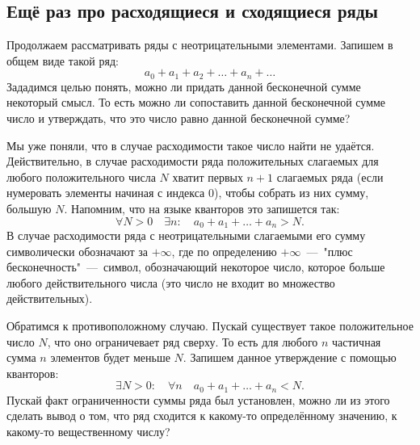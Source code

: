 \documentclass[12pt]{article}
\begin{document}
\subsection{Ещё раз про расходящиеся и сходящиеся ряды}
Продолжаем рассматривать ряды с неотрицательными элементами. Запишем в общем виде такой ряд:
\begin{equation}\label{eq:15}
    a_0 + a_1 + a_2 + \ldots + a_n + \ldots
\end{equation}
Зададимся целью понять, можно ли придать данной бесконечной сумме некоторый смысл. То есть можно ли сопоставить данной бесконечной сумме число и утверждать, что это число равно данной бесконечной сумме?
\par
Мы уже поняли, что в случае расходимости такое число найти не удаётся. Действительно, в случае расходимости ряда положительных слагаемых для любого положительного числа $N$ хватит первых $n + 1$ слагаемых ряда (если нумеровать элементы начиная с индекса $0$), чтобы собрать из них сумму, большую $N$. Напомним, что на языке кванторов это запишется так:
\begin{equation}
    \forall N > 0 \quad \exists n: \quad a_0 + a_1 + \ldots + a_n > N.
\end{equation}
В случае расходимости ряда с неотрицательными слагаемыми его сумму символически обозначают за $+\infty$, где по определению $+\infty$~\----~"плюс бесконечность"{}~\----~символ, обозначающий некоторое число, которое больше любого действительного числа (это число не входит во множество действительных).
\par
Обратимся к противоположному случаю. Пускай существует такое положительное число $N$, что оно ограничевает ряд сверху. То есть для любого $n$ частичная сумма $n$ элементов будет меньше $N$. Запишем данное утверждение с помощью кванторов:
\begin{equation}\label{eq:17}
    \exists N>0: \quad \forall n \quad a_0+a_1+\ldots+a_n<N.
\end{equation}
Пускай факт ограниченности суммы ряда был установлен, можно ли из этого сделать вывод о том, что ряд сходится к какому\--то определённому значению, к какому\--то вещественному числу?
\end{document}
